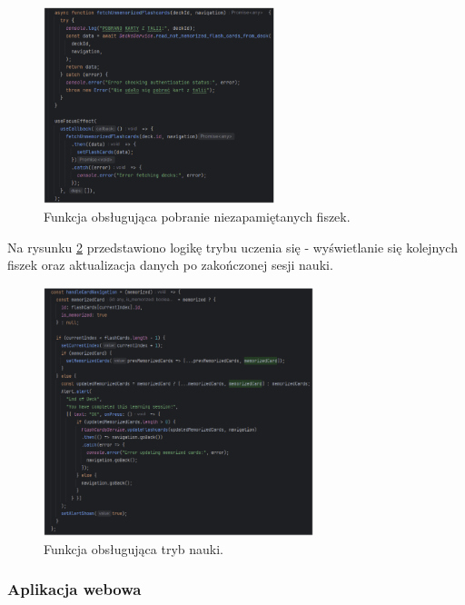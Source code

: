 \begin{figure}[H]
    \centering
    \includegraphics[width=0.6\textwidth]{chapters/chapter_8/screens/get_unmemorized_flash_cards_mobile}
    \caption{Funkcja obsługująca pobranie niezapamiętanych fiszek.}
    \label{img:get_unmemorized_flash_cards_mobile}
\end{figure}

Na rysunku \ref{img:update_unmemorized_flash_cards_mobile} przedstawiono logikę trybu uczenia się - wyświetlanie się kolejnych fiszek oraz aktualizacja danych po zakończonej sesji nauki.

\begin{figure}[H]
    \centering
    \includegraphics[width=0.7\textwidth]{chapters/chapter_8/screens/update_unmemorized_flash_cards_mobile}
    \caption{Funkcja obsługująca tryb nauki.}
    \label{img:update_unmemorized_flash_cards_mobile}
\end{figure}

\subsubsection{Aplikacja webowa}

